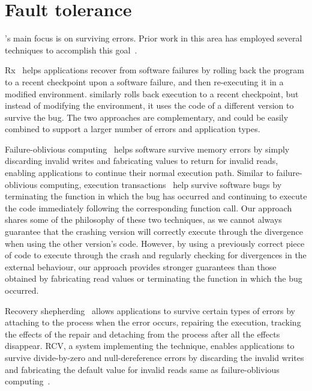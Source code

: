 \section{Fault tolerance}

\mx's main focus is on surviving errors. Prior work in this area has employed
several techniques to accomplish this
goal~\cite{rx,compl-schedules11,fo,exec-trans06,vigilante,clearview,microreboots,shepherding:pldi14}.

Rx~\cite{rx} helps applications recover from software failures by
rolling back the program to a recent checkpoint upon a software
failure, and then re-executing it in a modified environment.  \mx
similarly rolls back execution to a recent checkpoint, but instead of
modifying the environment, it uses the code of a different version to
survive the bug.  The two approaches are complementary, and could be
easily combined to support a larger number of errors and application
types.

Failure-oblivious computing~\cite{fo} helps software survive memory
errors by simply discarding invalid writes and fabricating values to
return for invalid reads, enabling applications to continue their
normal execution path. Similar to failure-oblivious computing,
execution transactions~\cite{exec-trans06} help survive software bugs
by terminating the function in which the bug has occurred and
continuing to execute the code immediately following the
corresponding function call.  Our approach shares some of the
philosophy of these two techniques, as we cannot always guarantee that
the crashing version will correctly execute through the divergence
when using the other version's code.
However, by using a previously correct piece of code to execute
through the crash and regularly checking for divergences in the
external behaviour, our approach provides stronger guarantees than
those obtained by fabricating read values or terminating the function
in which the bug occurred.

Recovery shepherding~\cite{shepherding:pldi14} allows applications to survive
certain types of errors by attaching to the process when the error occurs,
repairing the execution, tracking the effects of the repair and detaching from
the process after all the effects disappear. RCV, a system implementing the
technique, enables applications to survive divide-by-zero and null-dereference
errors by discarding the invalid writes and fabricating the default value for
invalid reads same as failure-oblivious computing~\cite{fo}.

